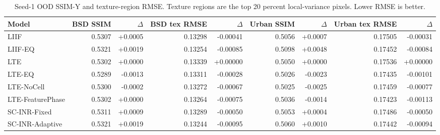 \begin{table}[t]
\centering
\small
\caption{Seed-1 OOD SSIM-Y and texture-region RMSE. Texture regions are the top 20 percent local-variance pixels. Lower RMSE is better.}
\label{tab:seed1_aux_quality_texture}
\begin{tabular}{lrrrrrrrr}
\toprule
Model & BSD SSIM & $\Delta$ & BSD tex RMSE & $\Delta$ & Urban SSIM & $\Delta$ & Urban tex RMSE & $\Delta$ \\
\midrule
LIIF & 0.5307 & +0.0005 & 0.13298 & -0.00041 & 0.5056 & +0.0007 & 0.17505 & -0.00031 \\
LIIF-EQ & 0.5321 & +0.0019 & 0.13254 & -0.00085 & 0.5098 & +0.0048 & 0.17452 & -0.00084 \\
LTE & 0.5302 & +0.0000 & 0.13339 & +0.00000 & 0.5050 & +0.0000 & 0.17536 & +0.00000 \\
LTE-EQ & 0.5289 & -0.0013 & 0.13311 & -0.00028 & 0.5026 & -0.0023 & 0.17435 & -0.00101 \\
LTE-NoCell & 0.5300 & -0.0002 & 0.13272 & -0.00067 & 0.5025 & -0.0025 & 0.17459 & -0.00077 \\
LTE-FeaturePhase & 0.5302 & +0.0000 & 0.13264 & -0.00075 & 0.5036 & -0.0014 & 0.17423 & -0.00113 \\
SC-INR-Fixed & 0.5311 & +0.0009 & 0.13289 & -0.00050 & 0.5053 & +0.0004 & 0.17486 & -0.00050 \\
SC-INR-Adaptive & 0.5321 & +0.0019 & 0.13244 & -0.00095 & 0.5060 & +0.0010 & 0.17442 & -0.00094 \\
\bottomrule
\end{tabular}
\end{table}
